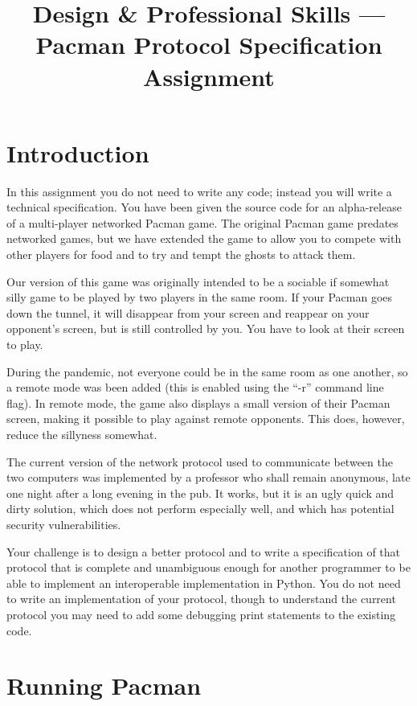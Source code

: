\documentclass{article}
\title{Design \& Professional Skills --- Pacman Protocol Specification Assignment}
\author{}
\date{}
\begin{document}
\maketitle

\section{Introduction}

In this assignment you do not need to write any code; instead you will
write a technical specification.  You have been given the source code
for an alpha-release of a multi-player networked Pacman game.  The
original Pacman game predates networked games, but we have extended
the game to allow you to compete with other players for food and to
try and tempt the ghosts to attack them.

Our version of this game was originally intended to be a sociable if
somewhat silly game to be played by two players in the same room. If
your Pacman goes down the tunnel, it will disappear from your screen
and reappear on your opponent's screen, but is still controlled by
you.  You have to look at their screen to play.

During the pandemic, not everyone could be in the same room as
one another, so a remote mode was been added (this is enabled using
the ``-r'' command line flag).  In remote mode, the game also displays a
small version of their Pacman screen, making it possible to play
against remote opponents. This does, however, reduce the sillyness somewhat.

The current version of the network protocol used to communicate between the
two computers was implemented by a professor who shall remain
anonymous, late one night after a long evening in the pub.  It works,
but it is an ugly quick and dirty solution, which does not perform
especially well, and which has potential security vulnerabilities.

Your challenge is to design a better protocol and to write a
specification of that protocol that is complete and unambiguous enough
for another programmer to be able to implement an interoperable
implementation in Python.  You do not need to write an implementation of your
protocol, though to understand the current protocol you may need to
add some debugging print statements to the existing code.

\section{Running Pacman}
\end{document}
